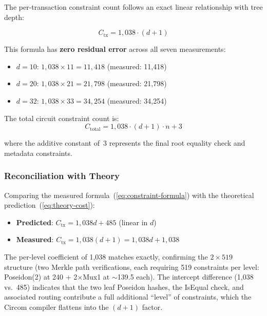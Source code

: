 The per-transaction constraint count follows an exact linear relationship
with tree depth:

\begin{equation}
C_{\text{tx}} = 1{,}038 \cdot (d + 1)
\label{eq:constraint-formula}
\end{equation}

This formula has \textbf{zero residual error} across all seven
measurements:

\begin{itemize}
\item $d{=}10$: $1{,}038 \times 11 = 11{,}418$ (measured: 11,418)
\item $d{=}20$: $1{,}038 \times 21 = 21{,}798$ (measured: 21,798)
\item $d{=}32$: $1{,}038 \times 33 = 34{,}254$ (measured: 34,254)
\end{itemize}

The total circuit constraint count is:
\begin{equation}
C_{\text{total}} = 1{,}038 \cdot (d + 1) \cdot n + 3
\label{eq:total-formula}
\end{equation}

where the additive constant of~3 represents the final root equality
check and metadata constraints.

\subsubsection{Reconciliation with Theory}

Comparing the measured formula~(\ref{eq:constraint-formula}) with the
theoretical prediction~(\ref{eq:theory-cost}):

\begin{itemize}
\item \textbf{Predicted}: $C_{\text{tx}} = 1{,}038d + 485$ (linear in $d$)
\item \textbf{Measured}: $C_{\text{tx}} = 1{,}038(d+1) = 1{,}038d + 1{,}038$
\end{itemize}

The per-level coefficient of 1,038 matches exactly, confirming the
$2 \times 519$ structure (two Merkle path verifications, each requiring
519 constraints per level: Poseidon(2) at 240 + 2$\times$Mux1 at
$\sim$139.5 each). The intercept difference (1,038 vs.~485) indicates
that the two leaf Poseidon hashes, the IsEqual check, and associated
routing contribute a full additional ``level'' of constraints, which
the Circom compiler flattens into the $(d+1)$ factor.

